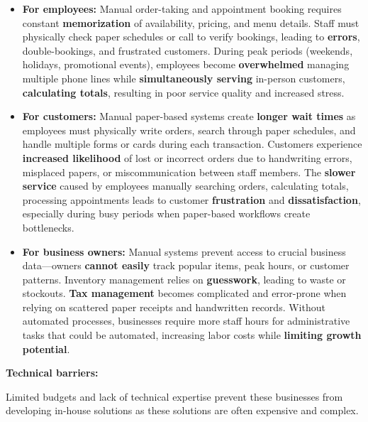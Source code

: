 \documentclass[]{VUMIFTemplateClass}
\newcommand{\todocomment}[1]{%
    \begin{tcolorbox}[colback=red!20, colframe=red!60, arc=0pt, outer arc=0pt, boxrule=1pt, left=3pt, right=3pt, top=3pt, bottom=3pt]
        \textbf{\textcolor{orange!70!black}{TODO:}} #1
    \end{tcolorbox}
}
\begin{document}
\begin{itemize}
    \item \textbf{For employees:} Manual order-taking and appointment booking
    requires constant \textbf{memorization} of availability, pricing, and menu
    details. Staff must physically check paper schedules or call to verify
    bookings, leading to \textbf{errors}, double-bookings, and frustrated
    customers. During peak periods (weekends, holidays, promotional events),
    employees become \textbf{overwhelmed} managing multiple phone lines while
    \textbf{simultaneously serving} in-person customers, \textbf{calculating
    totals}, resulting in poor service quality and increased stress.

    \item \textbf{For customers:} Manual paper-based systems create
    \textbf{longer wait times} as employees must physically write orders, search
    through paper schedules, and handle multiple forms or cards during each
    transaction. Customers experience \textbf{increased likelihood} of lost or
    incorrect orders due to handwriting errors, misplaced papers, or
    miscommunication between staff members. The \textbf{slower service} caused
    by employees manually searching orders, calculating totals, processing
    appointments leads to customer \textbf{frustration} and
    \textbf{dissatisfaction}, especially during busy periods when paper-based
    workflows create bottlenecks.

    \item \textbf{For business owners:} Manual systems prevent access to crucial
    business data—owners \textbf{cannot easily} track popular items, peak hours, or
    customer patterns. Inventory management relies on \textbf{guesswork}, leading to
    waste or stockouts. \textbf{Tax management} becomes complicated and
    error-prone when relying on scattered paper receipts and handwritten
    records. Without automated processes, businesses require more
    staff hours for administrative tasks that could be automated, increasing
    labor costs while \textbf{limiting growth potential}.
\end{itemize}

\textbf{Technical barriers:}

Limited budgets and lack of technical expertise prevent these businesses from
developing in-house solutions as these solutions are often expensive and complex.
\end{document}
